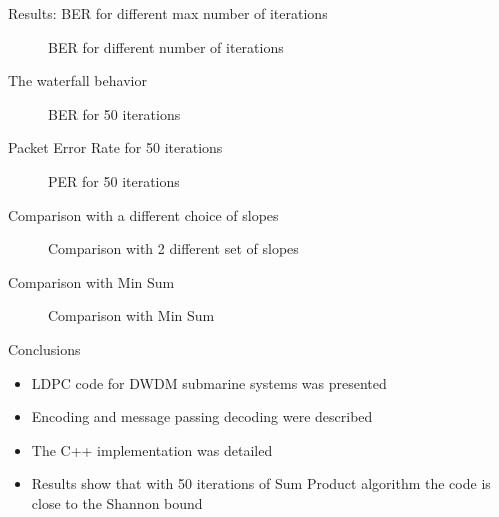 \documentclass[pdf]
          {beamer}
\newlength\fheight
\newlength\fwidth
\begin{document}
\begin{frame}{Results: BER for different max number of iterations}
	\begin{figure}[t]
		\centering
		\setlength{}
		\setlength{}
		
		\caption{\small{BER for different number of iterations}}
	\end{figure}
\end{frame}

\begin{frame}{The waterfall behavior}
	\begin{figure}[t]
		\centering
		\setlength{}
		\setlength{}
		
		\caption{\small{BER for 50 iterations}}
	\end{figure}
\end{frame}

\begin{frame}{Packet Error Rate for 50 iterations}
	\begin{figure}[t]
		\centering
		\setlength{}
		\setlength{}
		
		\caption{\small{PER for 50 iterations}}
	\end{figure}
\end{frame}

\begin{frame}{Comparison with a different choice of slopes}
	\begin{figure}[t]
		\centering
		\setlength{}
		\setlength{}
		
		\caption{\small{Comparison with 2 different set of slopes}}
	\end{figure}
\end{frame}

\begin{frame}{Comparison with Min Sum}
	\begin{figure}[t]
		\centering
		\setlength{}
		\setlength{}
		
		\caption{\small{Comparison with Min Sum}}
	\end{figure}
\end{frame}

\begin{frame}{Conclusions}
    \begin{itemize}
    	\item LDPC code for DWDM submarine systems was presented
 		\item Encoding and message passing decoding were described
 		\item The C++ implementation was detailed
 		\item Results show that with 50 iterations of Sum Product algorithm the code is close to the Shannon bound
	\end{itemize}
\end{frame}
\end{document}

